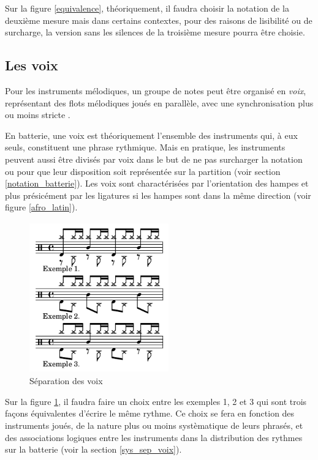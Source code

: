 Sur la figure \ref{equivalence}, théoriquement, il faudra choisir la notation
de la deuxième mesure mais dans certains contextes, pour des raisons de
lisibilité ou de surcharge, la version sans les silences de la troisième mesure
pourra être choisie.

\subsection*{Les voix}
Pour les instruments mélodiques, un groupe de notes peut être organisé en
\emph{voix}, représentant des flots mélodiques joués en parallèle, avec une
synchronisation plus ou moins stricte \cite{SHIBATA2021262}
\cite{Guiomard-Kagan}.

En batterie, une voix est théoriquement l’ensemble des instruments qui, à eux
seuls, constituent une phrase rythmique. Mais en pratique, les instruments
peuvent aussi être divisés par voix dans le but de ne pas surcharger la
notation ou pour que leur disposition soit représentée sur la
partition (voir section \ref{notation_batterie}).
Les voix sont charactérisées par l’orientation des hampes et plus présicément
par les ligatures si les hampes sont dans la même direction (voir figure
\ref{afro_latin}).

\begin{figure}[h]
	\centering
	\includegraphics[height=65mm, width=60mm]{
    z_images/3_methodes/0_notation_de_la_batterie/7_voix.png}
	\caption{Séparation des voix}
	\label{sep_voix}
\end{figure}
Sur la figure \ref{sep_voix}, il faudra faire un choix entre les exemples 1, 2
et 3 qui sont trois façons équivalentes d’écrire le même rythme.
Ce choix se fera en fonction des instruments joués, de la nature plus ou moins
systèmatique de leurs phrasés, et des associations logiques entre les
instruments dans la distribution des rythmes sur la batterie (voir la section
\ref{sys_sep_voix}).

